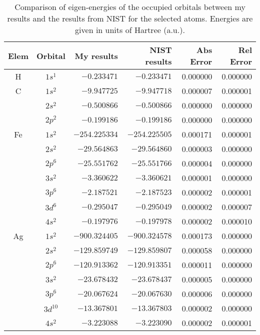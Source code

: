 \begin{table}[h!]
\caption{Comparison of eigen-energies of the occupied orbitals between my results and
the results from NIST for the selected atoms. Energies are given in units of Hartree (a.u.).}
\label{table:SCFeigE}
\begin{center}
\begin{tabular}{ c | c | r | r | r | r }
  \hline
  Elem & Orbital & My results & NIST results & Abs Error & Rel Error \\ \hline \hline
  H &  $1s^1$  &  $-0.233471$  &  $-0.233471$  &  0.000000  &  0.000000 \\  \hline
  C &  $1s^2$  &  $-9.947725$  &  $-9.947718$  &  0.000007  &  0.000001 \\ 
    &  $2s^2$  &  $-0.500866$  &  $-0.500866$  &  0.000000  &  0.000000 \\ 
    &  $2p^2$  &  $-0.199186$  &  $-0.199186$  &  0.000000  &  0.000000 \\ \hline
 Fe &  $1s^2$  &  $-254.225334$  &  $-254.225505$  &  0.000171  &  0.000001 \\ 
    &  $2s^2$  &  $-29.564863$  &  $-29.564860$  &  0.000003  &  0.000000 \\ 
    &  $2p^6$  &  $-25.551762$  &  $-25.551766$  &  0.000004  &  0.000000 \\ 
    &  $3s^2$  &  $-3.360622$  &  $-3.360621$  &  0.000001  &  0.000000 \\ 
    &  $3p^6$  &  $-2.187521$  &  $-2.187523$  &  0.000002  &  0.000001 \\
    &  $3d^6$  &  $-0.295047$  &  $-0.295049$  &  0.000002  &  0.000007 \\
    &  $4s^2$  &  $-0.197976$  &  $-0.197978$  &  0.000002  &  0.000010 \\ \hline
 Ag &  $1s^2$  &  $-900.324405$  &  $-900.324578$  &  0.000173  &  0.000000 \\ 
    &  $2s^2$  &  $-129.859749$  &  $-129.859807$  &  0.000058  &  0.000000 \\ 
    &  $2p^6$  &  $-120.913362$  &  $-120.913351$  &  0.000011  &  0.000000 \\ 
    &  $3s^2$  &  $-23.678432$  &  $-23.678437$  &  0.000005  &  0.000000 \\ 
    &  $3p^6$  &  $-20.067624$  &  $-20.067630$  &  0.000006  &  0.000000 \\ 
    &  $3d^{10}$  &  $-13.367801$  &  $-13.367803$  &  0.000002  &  0.000000 \\ 
    &  $4s^2$  &  $-3.223088$  &  $-3.223090$  &  0.000002  &  0.000001 \\ 

\end{tabular}
\end{center}
\end{table}
